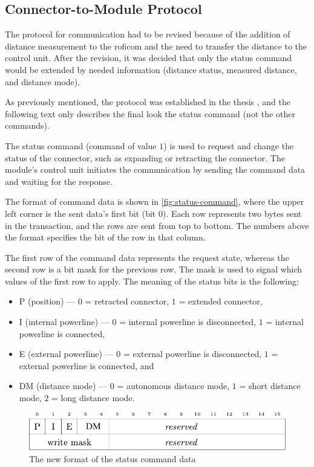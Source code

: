 \documentclass[
  digital,     %
  oneside,     %
  nosansbold,  %
  nocolorbold, %
  nolof,         %
  nolot,         %
]{fithesis4}
\begin{document}
\subsection{ Connector-to-Module Protocol }

The protocol for communication had to be revised because of the addition of distance measurement to
the \acrshort{roficom} and the need to transfer the distance to the control unit. After the
revision, it was decided that only the status command would be extended by needed information
(distance status, measured distance, and distance mode).

As previously mentioned, the protocol was established in the thesis
\cite[p.~19--22]{Mrazek2019thesis}, and the following text only describes the final look the status
command (not the other commands).

The status command (command of value $1$) is used to request and change the status of the connector,
such as expanding or retracting the connector. The module's control unit initiates the communication
by sending the command data and waiting for the response.

The format of command data is shown in \autoref{fig:status-command}, where the upper left corner is
the sent data's first bit (bit $0$). Each row represents two bytes sent in the transaction, and the
rows are sent from top to bottom. The numbers above the format specifies the bit of the row in that
column.

The first row of the command data represents the request state, whereas the second row is a bit mask
for the previous row. The mask is used to signal which values of the first row to apply. The meaning
of the status bits is the following:

\begin{itemize}
    \item P (position) --- $0$ = retracted connector, $1$ = extended connector,
    \item I (internal powerline) --- $0$ = internal powerline is disconnected, $1$ = internal powerline is connected,
    \item E (external powerline) --- $0$ = external powerline is disconnected, $1$ = external powerline is connected, and
    \item DM (distance mode) --- $0$ = autonomous distance mode, $1$ = short distance mode, $2$ = long distance mode. 
\end{itemize}

\begin{figure}
    \includegraphics[width=\textwidth,height=\textheight,keepaspectratio]{assets/status_command_new.pdf}
    \caption[Status command data]{The new format of the status command data}
    \label{fig:status-command}
\end{figure}
\end{document}
